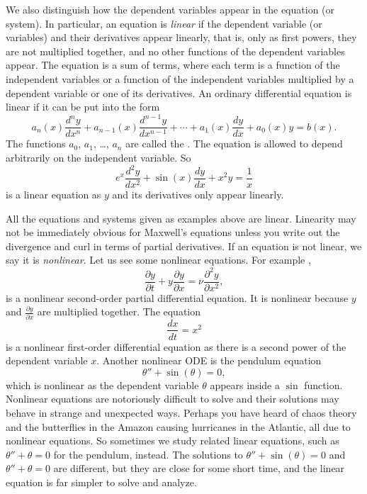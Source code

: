 We also distinguish how the dependent variables appear in the equation (or
system).  In particular, an equation is
\emph{linear} if the
dependent variable (or variables) and their derivatives appear linearly,
that is, only as first powers, they are not multiplied together,
and no other functions of the dependent
variables appear.  The equation is a sum of terms,
where each term is
a function of the independent variables
or 
a function of the independent variables
multiplied by a dependent variable
or one of its derivatives.
An ordinary differential equation is linear if it can be
put into the form
\begin{equation} \label{classification:eqlingen}
a_n(x) \frac{d^n y}{dx^n} + 
a_{n-1}(x) \frac{d^{n-1} y}{dx^{n-1}} + 
\cdots
+
a_{1}(x) \frac{dy}{dx}
+
a_{0}(x) y = b(x) .
\end{equation}
The functions $a_0$, $a_1$, \ldots, $a_n$ are called the
\emph{}.
The equation is allowed to depend arbitrarily on the independent variable.
So 
\begin{equation} \label{classification:eqlinex}
e^x \frac{d^2 y}{dx^2} + 
\sin(x) \frac{d y}{dx} + 
x^2 y
=
\frac{1}{x}
\end{equation}
is a linear equation as $y$ and its derivatives only appear linearly.

All the equations and systems given as examples above are linear.  
Linearity may not be immediately obvious for Maxwell's equations unless you write out
the divergence and curl in terms of partial derivatives.
If an equation is not linear, we say it is
\emph{nonlinear}.
Let us see some
nonlinear equations.  For example ,
\begin{equation*}
\frac{\partial y}{\partial t} + 
y \frac{\partial y}{\partial x} =
\nu \frac{\partial^2 y}{\partial x^2} ,
\end{equation*}
is a nonlinear second-order partial differential equation.  It is nonlinear
because $y$ and $\frac{\partial y}{\partial x}$ are multiplied together.
The equation
\begin{equation} \label{classification:eqnonlinode}
\frac{dx}{dt} = x^2
\end{equation}
is a nonlinear first-order differential equation as there is a second power of
the dependent variable $x$.  Another nonlinear ODE is the pendulum equation
\begin{equation} \label{classification:pendulum}
\theta''+\sin(\theta)=0 ,
\end{equation}
which is nonlinear as the dependent
variable $\theta$ appears inside a $\sin$ function.
Nonlinear equations are notoriously difficult to solve and
their solutions may behave in strange and unexpected ways.
Perhaps you have heard of chaos theory and the butterflies 
in the Amazon causing hurricanes in the Atlantic, all due to nonlinear
equations.
So sometimes we
study related linear equations, such as $\theta''+\theta=0$ for the pendulum, instead.
The solutions to $\theta''+\sin(\theta) = 0$ and
$\theta''+\theta=0$ are different, but they are
close for some short time, and the linear equation
is far simpler to solve and analyze.

